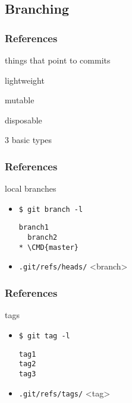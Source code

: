 \documentclass[english]{beamer}
\newcommand{\mysubsection}[2]{%
  \hypertarget{#2}{}%
  \subsection{#1}%
  \label{#2}%
}
\newcommand{\CMD}[1]{%
\texttt{\textcolor{code-blue}{#1}}%
}
\newcommand{\cmd}[1]{%
\texttt{\textcolor{code-orange}{#1}}%
}
\begin{document}
\mysubsection{Branching}{using:branching}
\begin{frame}
\frametitle{References}
things that point to commits

\pause{}
\vspace{\baselineskip}
lightweight

\pause{}
\vspace{\baselineskip}
mutable

\pause{}
\vspace{\baselineskip}
disposable

\pause{}
\vspace{\baselineskip}
3 basic types

\end{frame}

\begin{frame}[fragile]
\frametitle{References}
local branches
\begin{itemize}
        \item \CMD{\$ git branch -l} \\
                {\small
                \begin{Verbatim}[commandchars=\\\{\}]
  branch1
  branch2
* \CMD{master}
                \end{Verbatim}
                }
        \item \cmd{.git/refs/heads/}<branch>
\end{itemize}
\end{frame}

\begin{frame}[fragile]
\frametitle{References}
tags
\begin{itemize}
        \item \CMD{\$ git tag -l} \\
                {\small
                \begin{Verbatim}[commandchars=\\\{\}]
tag1
tag2
tag3
                \end{Verbatim}
                }
        \item \cmd{.git/refs/tags/}<tag>
\end{itemize}
\end{frame}
\end{document}
